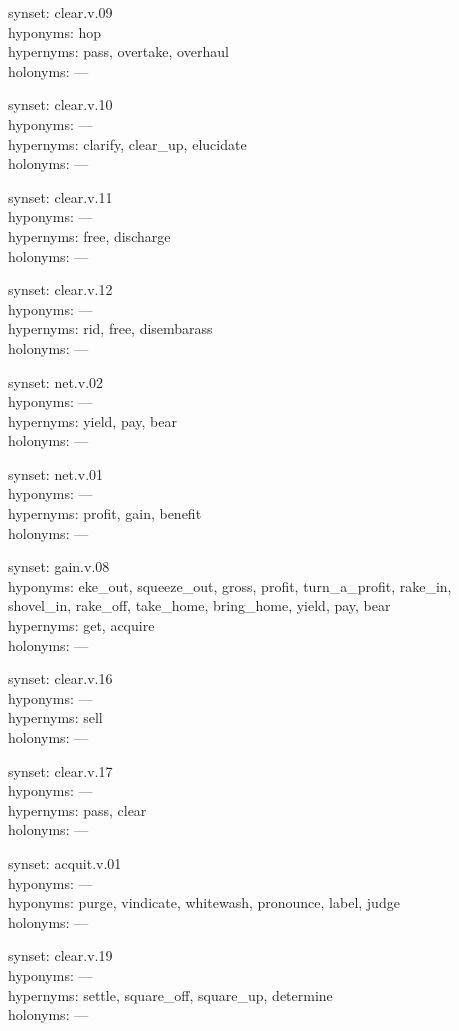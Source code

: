 \begin{multicols}{2}
synset: clear.v.09\\
hyponyms: hop\\
hypernyms: pass, overtake, overhaul\\
holonyms: ---

synset: clear.v.10\\
hyponyms: ---\\
hypernyms: clarify, clear\_up, elucidate\\
holonyms: ---

synset: clear.v.11\\
hyponyms: ---\\
hypernyms: free, discharge\\
holonyms: ---

synset: clear.v.12\\
hyponyms: ---\\
hypernyms: rid, free, disembarass\\
holonyms: ---

synset: net.v.02\\
hyponyms: ---\\
hypernyms: yield, pay, bear\\
holonyms: ---

synset: net.v.01\\
hyponyms: ---\\
hypernyms: profit, gain, benefit\\
holonyms: ---

synset: gain.v.08\\
hyponyms: eke\_out, squeeze\_out, gross, profit, turn\_a\_profit, rake\_in, shovel\_in, rake\_off, take\_home, bring\_home, yield, pay, bear\\
hypernyms: get, acquire\\
holonyms: ---

synset: clear.v.16\\
hyponyms: ---\\
hypernyms: sell\\
holonyms: ---

synset: clear.v.17\\
hyponyms: ---\\
hypernyms: pass, clear\\
holonyms: ---

synset: acquit.v.01\\
hyponyms: ---\\
hyponyms: purge, vindicate, whitewash, pronounce, label, judge\\
holonyms: ---

synset: clear.v.19\\
hyponyms: ---\\
hypernyms: settle, square\_off, square\_up, determine\\
holonyms: ---


\end{multicols}
